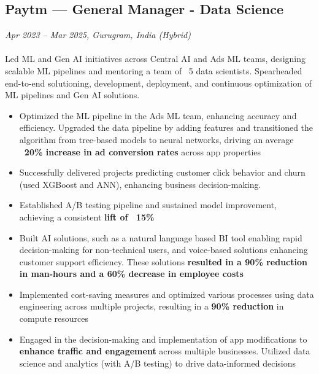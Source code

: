 \documentclass[a4paper,10pt]{article}
\begin{document}
\subsection*{Paytm — General Manager - Data Science}
\textit{Apr 2023 – Mar 2025, Gurugram, India (Hybrid)} \\
\\
Led ML and Gen AI initiatives across Central AI and Ads ML teams, designing scalable ML pipelines and mentoring a team of ~5 data scientists. Spearheaded end-to-end solutioning, development, deployment, and continuous optimization of ML pipelines and Gen AI solutions.
\begin{itemize}
    \item Optimized the ML pipeline in the Ads ML team, enhancing accuracy and efficiency. Upgraded the data pipeline by adding features and transitioned the algorithm from tree-based models to neural networks, driving an average \textbf{~20\% increase in ad conversion rates} across app properties
    \item Successfully delivered projects predicting customer click behavior and churn (used XGBoost and ANN), enhancing business decision-making.
    \item Established A/B testing pipeline and sustained model improvement, achieving a consistent \textbf{lift of ~15\%}
    \item Built AI solutions, such as a natural language based BI tool enabling rapid decision-making for non-technical users, and voice-based solutions enhancing customer support efficiency. These solutions \textbf{resulted in a 90\% reduction in man-hours and a 60\% decrease in employee costs}
    \item Implemented cost-saving measures and optimized various processes using data engineering across multiple projects, resulting in a \textbf{90\% reduction} in compute resources
    \item Engaged in the decision-making and implementation of app modifications to \textbf{enhance traffic and engagement} across multiple businesses. Utilized data science and analytics (with A/B testing) to drive data-informed decisions
\end{itemize}
\end{document}
